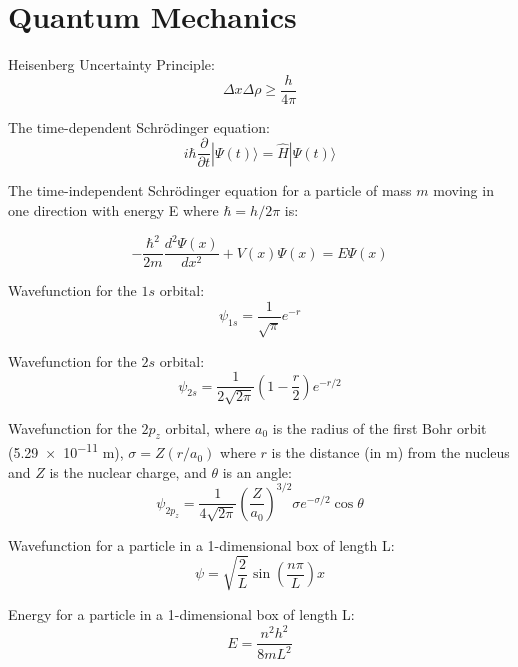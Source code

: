 \documentclass[10pt]{article}
\begin{document}
\section{Quantum Mechanics}

Heisenberg Uncertainty Principle:
\begin{equation*}
\Delta x \Delta\rho \ge \frac{h}{4\pi}
\end{equation*}

The time-dependent Schr\"odinger equation:
\begin{equation*}
i\hbar\frac{\partial}{\partial t}|\Psi(t)\rangle = \hat{H}|\Psi(t)\rangle
\end{equation*}

The time-independent Schr\"odinger equation for a particle of mass $m$ moving in one direction with energy E where $\hbar=h/2\pi$ is:

\begin{equation*}
-\frac{\hbar^2}{2m}\frac{d^2\Psi(x)}{dx^2}+V(x)\Psi(x)=E\Psi(x)
\end{equation*}

Wavefunction for the $1s$ orbital:
\begin{equation*}
\psi_{1s} = \frac{1}{\sqrt{\pi}}e^{-r}
\end{equation*}

Wavefunction for the $2s$ orbital:
\begin{equation*}
\psi_{2s} = \frac{1}{2\sqrt{2\pi}}\left(1-\frac{r}{2}\right)e^{-r/2}
\end{equation*}

Wavefunction for the $2p_z$ orbital, where $a_0$ is the radius of the first Bohr orbit (\num{5.29e-11} m), $\sigma = Z(r/a_0)$ 
where $r$ is the distance (in m) from the nucleus and $Z$ is the nuclear charge, and $\theta$ is an angle:
\begin{equation*}
\psi_{2p_z} = \frac{1}{4\sqrt{2\pi}}\left(\frac{Z}{a_0}\right)^{3/2}\sigma e^{-\sigma/2}\cos\theta
\end{equation*}

Wavefunction for a particle in a 1-dimensional box of length L:
\begin{equation*}
\psi=\sqrt{\frac{2}{L}}\sin\left(\frac{n\pi}{L}\right)x
\end{equation*}

Energy for a particle in a 1-dimensional box of length L:
\begin{equation*}
E = \frac{n^2h^2}{8mL^2}
\end{equation*}
\end{document}

